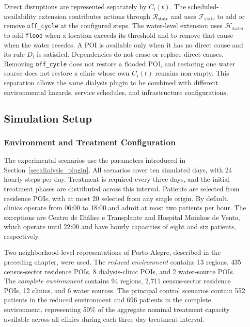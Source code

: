 Direct disruptions are represented separately by $C_i(t)$. The scheduled-availability extension contributes actions through $\mathcal{R}_{\mathrm{state}}$ and uses $\mathcal{F}_{\mathrm{state}}$ to add or remove \texttt{off\_}\allowbreak\texttt{cycle} at the configured steps. The water-level extension uses $\mathcal{H}_{\mathrm{water}}$ to add \texttt{flood} when a location exceeds its threshold and to remove that cause when the water recedes. A POI is available only when it has no direct cause and its rule $D_i$ is satisfied. Dependencies do not erase or replace direct causes. Removing \texttt{off\_}\allowbreak\texttt{cycle} does not restore a flooded POI, and restoring one water source does not restore a clinic whose own $C_i(t)$ remains non-empty. This separation allows the same dialysis plugin to be combined with different environmental hazards, service schedules, and infrastructure configurations.

\subsection{Simulation Setup}
\label{sec:dialysis_setup}

\subsubsection{Environment and Treatment Configuration}

The experimental scenarios use the parameters introduced in Section~\ref{sec:dialysis_plugin}. All scenarios cover ten simulated days, with 24 hourly steps per day. Treatment is required every three days, and the initial treatment phases are distributed across this interval. Patients are selected from residence POIs, with at most 20 selected from any single origin. By default, clinics operate from 06:00 to 18:00 and admit at most two patients per hour. The exceptions are Centro de Diálise e Transplante and Hospital Moinhos de Vento, which operate until 22:00 and have hourly capacities of eight and six patients, respectively.

Two neighborhood-level representations of Porto Alegre, described in the preceding chapter, were used. The \textit{reduced environment} contains 13 regions, 435 census-sector residence POIs, 8 dialysis-clinic POIs, and 2 water-source POIs. The \textit{complete environment} contains 94 regions, 2,711 census-sector residence POIs, 12 clinics, and 6 water sources. The principal control scenarios contain 552 patients in the reduced environment and 696 patients in the complete environment, representing 50\% of the aggregate nominal treatment capacity available across all clinics during each three-day treatment interval.

